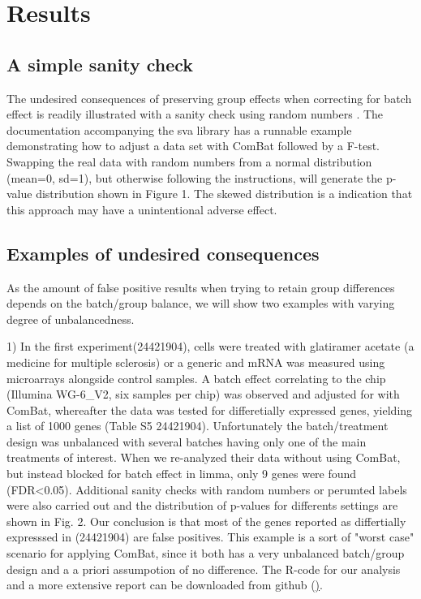 \documentclass{bio}
\begin{document}
\section{Results}

\subsection{A simple sanity check}

The undesired consequences of preserving group effects when correcting for batch effect is readily illustrated with a sanity check using random numbers . The documentation accompanying the sva library has a runnable example demonstrating how to adjust a data set with ComBat followed by a F-test. Swapping the real data with random numbers from a normal distribution (mean=0, sd=1), but otherwise following the instructions, will generate the p-value distribution shown in Figure 1. The skewed distribution is a indication that this approach may have a unintentional adverse effect. 



\subsection{Examples of undesired consequences}

As the amount of false positive results when trying to retain group differences depends on the batch/group balance, we will show two examples with varying degree of unbalancedness. 

1) In the first experiment(24421904), cells were treated with glatiramer acetate (a medicine for multiple sclerosis) or a generic and mRNA was measured using microarrays alongside control samples. A batch effect correlating to the chip (Illumina WG-6\_V2, six samples per chip) was observed and adjusted for with ComBat, whereafter the data was tested for differetially expressed genes, yielding a list of 1000 genes (Table S5 24421904). Unfortunately the batch/treatment design was unbalanced with several batches having only one of the main treatments of interest. When we re-analyzed their data without using ComBat, but instead blocked for batch effect in limma, only 9 genes were found (FDR<0.05). Additional sanity checks with random numbers or perumted labels were also carried out and the distribution of p-values for differents settings are shown in Fig. 2.  Our conclusion is that most of the genes reported as differtially expresssed in (24421904) are false positives. This example is a sort of "worst case" scenario for applying ComBat, since it both has a very unbalanced batch/group design and a a priori assumpotion of no difference. The R-code for our analysis and a more extensive report can be downloaded from github (\href{https://github.com/vegardny/combat_tests.git}).
\end{document}

